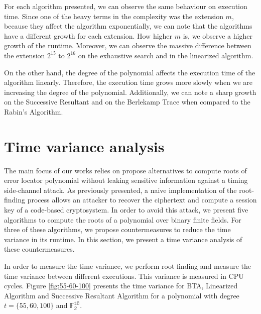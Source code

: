 For each algorithm presented, we can observe the same behaviour on execution time. Since one of the heavy terms in the complexity was the extension $m$, because they affect the algorithm exponentially, we can note that the algorithms have a different growth for each extension. How higher $m$ is, we observe a higher growth of the runtime. Moreover, we can observe the massive difference between the extension $2^{15}$ to $2^{16}$ on the exhaustive search and in the linearized algorithm. 

On the other hand, the degree of the polynomial affects the execution time of the algorithm linearly. Therefore, the execution time grows more slowly when we are increasing the degree of the polynomial. Additionally, we can note a sharp growth on the Successive Resultant and on the Berlekamp Trace when compared to the Rabin's Algorithm.

\section{Time variance analysis}
The main focus of our works relies on propose alternatives to compute roots of error locator polynomial without leaking sensitive information against a timing side-channel attack. As previously presented, a naive implementation of the root-finding process allows an attacker to recover the ciphertext and compute a session key of a code-based cryptosystem. In order to avoid this attack, we present five algorithms to compute the roots of a polynomial over binary finite fields. For three of these algorithms, we propose countermeasures to reduce the time variance in its runtime. In this section, we present a time variance analysis of these countermeasures.

In order to measure the time variance, we perform root finding and measure the time variance between different executions. This variance is measured in CPU cycles. Figure \ref{fig:55-60-100} presents the time variance for BTA, Linearized Algorithm and Successive Resultant Algorithm for a polynomial with degree $t = \{55, 60, 100\}$ and $\mathbb{F_2^{16}}$.


